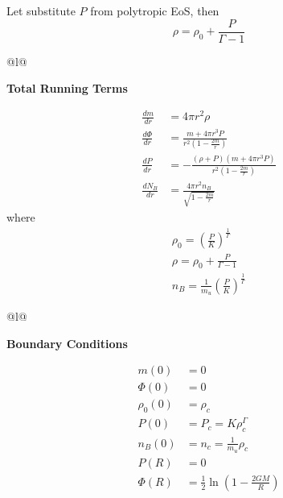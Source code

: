 \documentclass[]{book}
\begin{document}
Let substitute \(P\) from polytropic EoS, then
\[\rho = \rho_0 + \frac{P}{\Gamma-1}\]

\begin{longtable}[]{@{}l@{}}
\toprule
\endhead
\begin{minipage}[t]{0.97\columnwidth}\raggedright
\textbf{Total Running Terms }\strut
\end{minipage}\tabularnewline
\begin{minipage}[t]{0.97\columnwidth}\raggedright
\[\begin{aligned}
\frac{dm}{dr} &= 4\pi r^2 \rho \\
\frac{d\Phi}{dr} &= \frac{ m + 4\pi r^3 P}{r^2 (1 - \frac{2m}{r})} \\
\frac{dP}{dr} &= - \frac{(\rho + P)(m + 4\pi r^3 P)}{r^2 (1 - \frac{2m}{r})} \\
\frac{dN_B}{dr} &= \frac{4\pi r^2 n_B}{\sqrt{1 - \frac{2m}{r}}}
\end{aligned}\]
where
\[\begin{gathered}
\rho_0 = \left(\frac{P}{K}\right)^{\frac{1}{\Gamma}} \\
\rho = \rho_0 + \frac{P}{\Gamma - 1} \\
n_B = \frac{1}{m_u} \left(\frac{P}{K}\right)^{\frac{1}{\Gamma}}
\end{gathered}\]\strut
\end{minipage}\tabularnewline
\bottomrule
\end{longtable}

\begin{longtable}[]{@{}l@{}}
\toprule
\endhead
\begin{minipage}[t]{0.97\columnwidth}\raggedright
\textbf{Boundary Conditions}\strut
\end{minipage}\tabularnewline
\begin{minipage}[t]{0.97\columnwidth}\raggedright
\[\begin{aligned}
m(0) &= 0\\
\Phi(0) &= 0\\
\rho_0(0) &= \rho_c \\
P(0) &= P_c = K\rho_c^{\Gamma}\\
n_B(0) &= n_c = \frac{1}{m_u} \rho_c \\
P(R) &= 0 \\
\Phi(R) &= \frac{1}{2}\ln \left(1 - \frac{2GM}{R}\right)
\end{aligned}\]\strut
\end{minipage}\tabularnewline
\bottomrule
\end{longtable}


\end{document}
